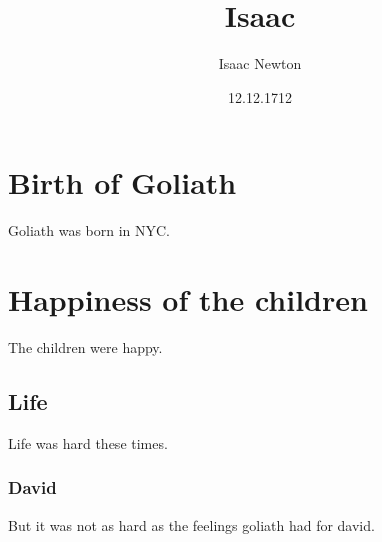 \documentclass{article}
\title{Isaac}
\author{Isaac Newton}
\date{12.12.1712}
\begin{document}
	\maketitle
	\newpage
	\doublespacing
	\tableofcontents
	\singlespacing
	\newpage
	\section{Birth of Goliath}
	Goliath was born in NYC.
	\section{Happiness of the children}
	The children were happy.
	\subsection{Life}
	Life was hard these times.
	\subsubsection{David}
	But it was not as hard as the feelings goliath had for david.
	
\end{document}
